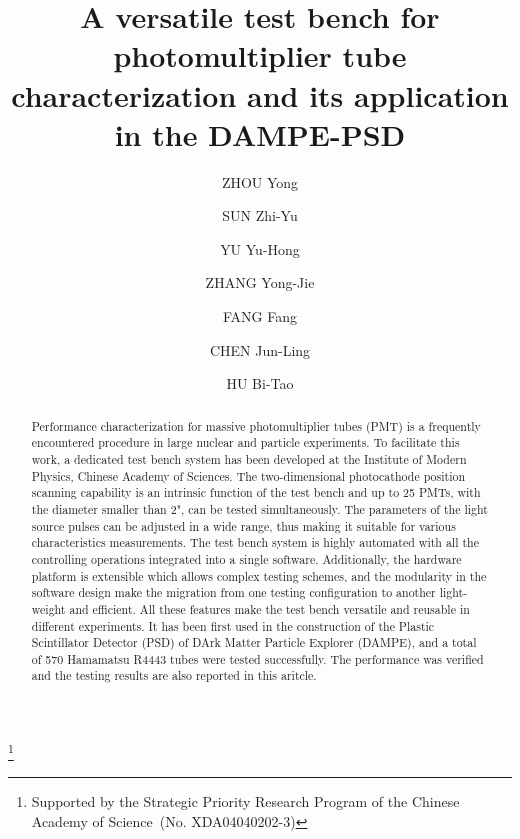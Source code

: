 \documentclass{nst}
\providecommand{\DIFadd}[1]{{\protect\color{yellow} #1}} %
\providecommand{\DIFaddbegin}{} %
\providecommand{\DIFaddend}{} %
\providecommand{\DIFdelbegin}{} %
\providecommand{\DIFdelend}{} %
\begin{document}
\title{A versatile test bench for photomultiplier tube characterization and its application in the DAMPE-PSD}\thanks{Supported by the Strategic Priority Research Program of the Chinese Academy of Science~(No. XDA04040202-3)}

\author[周勇]{ZHOU Yong}
\author[孙志宇]{SUN Zhi-Yu}
\author[余玉洪]{YU Yu-Hong}
\author[张永杰]{ZHANG Yong-Jie}
\author[方芳]{FANG Fang}
\author[陈俊岭]{CHEN Jun-Ling}
\author[胡碧涛]{HU Bi-Tao}


\begin{abstract}
 Performance characterization for massive photomultiplier tubes (PMT) is a frequently encountered procedure in large nuclear and particle experiments. To facilitate this work, a dedicated test bench system has been developed at the Institute of Modern Physics, Chinese Academy of Sciences.
 The two-dimensional photocathode position scanning capability is an intrinsic function of the test bench and up to 25 PMTs, with the diameter smaller than \DIFdelbegin \DIFdelend \DIFaddbegin \DIFadd{2"}\DIFaddend , can be tested simultaneously.
 The parameters of the light source pulses can be adjusted in a wide range, thus making it suitable for various characteristics measurements.
 The test bench system is highly automated with all the controlling operations integrated into a single software. 
 Additionally, the hardware platform is extensible which allows complex testing schemes, and the modularity in the software design make the migration from one testing configuration to another light-weight and efficient.
 All these features make the test bench versatile and reusable in different experiments.
 It has been first used in the construction of the Plastic Scintillator Detector (PSD) of DArk Matter Particle Explorer (DAMPE), and a total of 570 Hamamatsu R4443 tubes were tested successfully. The performance was verified and the testing results are also reported in this aritcle.
\end{abstract}
\end{document}
